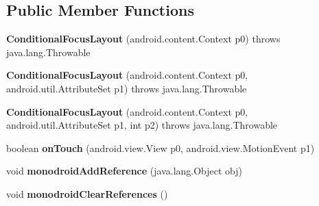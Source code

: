 \subsection*{Public Member Functions}
\begin{DoxyCompactItemize}
\item 
\mbox{\label{classmd5b60ffeb829f638581ab2bb9b1a7f4f3f_1_1ConditionalFocusLayout_ab571a4b93e045a68fdbd705da07026b3}} 
{\bfseries Conditional\+Focus\+Layout} (android.\+content.\+Context p0)  throws java.\+lang.\+Throwable 	
\item 
\mbox{\label{classmd5b60ffeb829f638581ab2bb9b1a7f4f3f_1_1ConditionalFocusLayout_a3068fc1b02a87f447c1bdd623a7f354c}} 
{\bfseries Conditional\+Focus\+Layout} (android.\+content.\+Context p0, android.\+util.\+Attribute\+Set p1)  throws java.\+lang.\+Throwable 	
\item 
\mbox{\label{classmd5b60ffeb829f638581ab2bb9b1a7f4f3f_1_1ConditionalFocusLayout_a73d3de427ee5a3dfdb53afaccc575b96}} 
{\bfseries Conditional\+Focus\+Layout} (android.\+content.\+Context p0, android.\+util.\+Attribute\+Set p1, int p2)  throws java.\+lang.\+Throwable 	
\item 
\mbox{\label{classmd5b60ffeb829f638581ab2bb9b1a7f4f3f_1_1ConditionalFocusLayout_a199b53215336706c0125f8e3b12b1dfc}} 
boolean {\bfseries on\+Touch} (android.\+view.\+View p0, android.\+view.\+Motion\+Event p1)
\item 
\mbox{\label{classmd5b60ffeb829f638581ab2bb9b1a7f4f3f_1_1ConditionalFocusLayout_ac7e7b0298a68db5a5b784eb1039ec067}} 
void {\bfseries monodroid\+Add\+Reference} (java.\+lang.\+Object obj)
\item 
\mbox{\label{classmd5b60ffeb829f638581ab2bb9b1a7f4f3f_1_1ConditionalFocusLayout_aa7ed542c35e17c2255ffde42f5b0d517}} 
void {\bfseries monodroid\+Clear\+References} ()
\end{DoxyCompactItemize}
